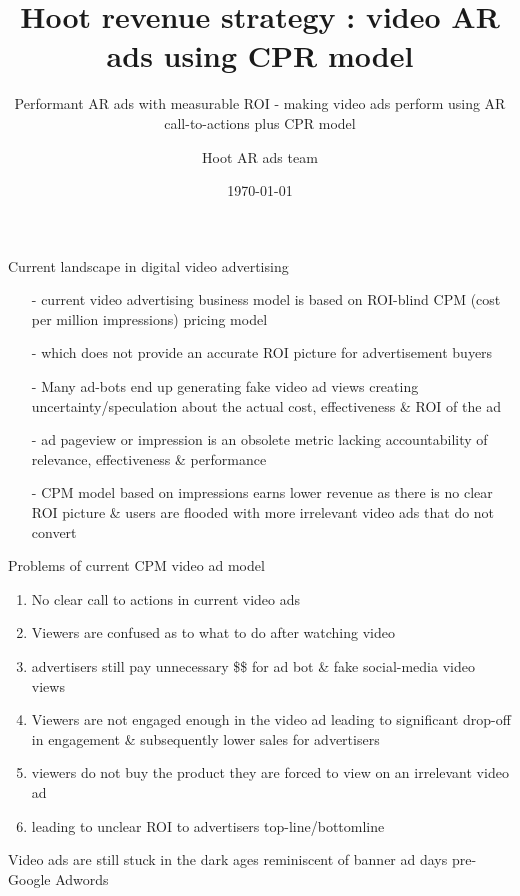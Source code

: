 \documentclass[11pt,handout]{beamer}
\title{ Hoot revenue strategy : video AR ads using CPR model}
\subtitle{Performant AR ads with measurable ROI - making video ads perform using AR call-to-actions plus CPR model}
\date{\today}
\author{Hoot AR ads team}
\institute{Hoot Live inc., a Delaware C-corp}
\begin{document}
\maketitle



\begin{frame}[fragile]{Current landscape in digital video advertising}
 \begin{itemize}[<+-| alert@+>]%
	 
\item[-]current video advertising business model is based on ROI-blind CPM (cost per million impressions) pricing model
\item[-]which does not provide an accurate ROI picture for advertisement buyers
\item[-]Many ad-bots end up generating fake video ad views creating uncertainty/speculation about the actual cost, effectiveness \& ROI of the ad
\item[-]ad pageview or impression is an obsolete metric lacking accountability of relevance, effectiveness \& performance 
\item[-]CPM model based on impressions earns lower revenue as there is no clear ROI picture \& users are flooded with more irrelevant video ads that do not convert
\end{itemize}

\end{frame}
\begin{frame}[t]{Problems of current CPM video ad model}
\begin{enumerate}[<+-| alert@+>]
\item No clear call to actions in current video ads
\item Viewers are confused as to what to do after watching video
\item advertisers still pay unnecessary \$\$ for ad bot \& fake social-media video views
\item Viewers are not engaged enough in the video ad leading to significant drop-off in engagement \& subsequently lower sales for advertisers
\item viewers do not buy the product they are forced to view on an irrelevant video ad
\item leading to unclear ROI to advertisers top-line/bottomline

\end{enumerate}
\pause
Video ads are still stuck in the dark ages reminiscent of banner ad days pre-Google Adwords

\end{frame}
\end{document}
